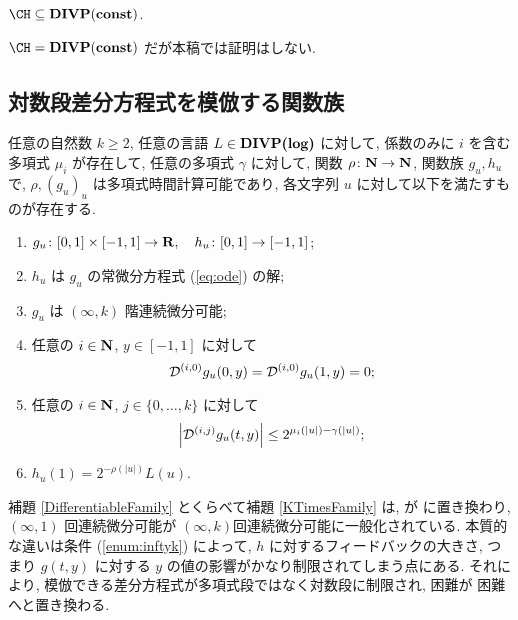 \begin{collorary}
 $\CH  \subseteq \bf DIVP(const)$.
\end{collorary}
$\CH = \bf DIVP(const)$ だが本稿では証明はしない.


\subsection{対数段差分方程式を模倣する関数族}

 \begin{lemma}
  \label{KTimesFamily}
  任意の自然数 $k \ge 2$,
  任意の言語 $L \in \text{\bf DIVP(log)}$ に対して,
  係数のみに $i$ を含む多項式 $\mu_i$ が存在して,
  任意の多項式 $\gamma$ に対して,
  関数 $\rho \colon \mathbf N \to \mathbf N$, 関数族 $g_u, h_u$ で,
  $\rho, (g_u)_u$ は多項式時間計算可能であり,
  各文字列 $u$ に対して以下を満たすものが存在する.
  \begin{enumerate}
   \item $g_u\colon [0,1] \times [-1,1]\to \mathbf R, \quad h_u\colon [0,1] \to [-1,1]$;
   \item $h_u$ は $g_u$ の常微分方程式 (\ref{eq:ode}) の解;
   \item $g_u$ は $(\infty, k)$ 階連続微分可能;
   \item 任意の $i \in \mathbf N$, $y \in [-1,1]$ に対して
	 \begin{equation*}
	  \mathcal D^{(i, 0)} g_u(0,y) = \mathcal D^{(i, 0)} g_u(1,y) = 0 ;
	 \end{equation*}
   \item \label{enum:inftyk}
	 任意の $i \in \mathbf N$, $j \in \{0, \dots, k\}$ に対して
	 \begin{equation*}
	  \left|\mathcal D^{(i,j)} g_u(t,y)\right| \le 2^{\mu_i(|u|) - \gamma(|u|)};
	 \end{equation*}
   \item $h_u(1) = 2^{-\rho(|u|)}L(u)$.
  \end{enumerate}
 \end{lemma}


補題 \ref{DifferentiableFamily} とくらべて補題 \ref{KTimesFamily} は,
\PSPACE が \DIVPlog に置き換わり, $(\infty, 1)$ 回連続微分可能が 
$(\infty, k)$回連続微分可能に一般化されている.
本質的な違いは条件 (\ref{enum:inftyk}) によって, $h$ に対するフィードバックの大きさ,
つまり $g(t,y)$ に対する $y$ の値の影響がかなり制限されてしまう点にある.
それにより, 模倣できる差分方程式が多項式段ではなく対数段に制限され,
\PSPACE 困難が \DIVPlog 困難へと置き換わる.




